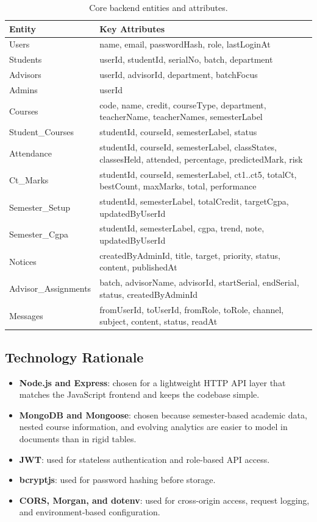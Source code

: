 \documentclass[12pt,a4paper]{article}
\begin{document}
\begin{table}[H]
\centering
\small
\begin{tabular}{L{3.1cm}L{8.7cm}}
\toprule
\textbf{Entity} & \textbf{Key Attributes} \\
\midrule
Users & name, email, passwordHash, role, lastLoginAt \\
Students & userId, studentId, serialNo, batch, department \\
Advisors & userId, advisorId, department, batchFocus \\
Admins & userId \\
Courses & code, name, credit, courseType, department, teacherName, teacherNames, semesterLabel \\
Student\_Courses & studentId, courseId, semesterLabel, status \\
Attendance & studentId, courseId, semesterLabel, classStates, classesHeld, attended, percentage, predictedMark, risk \\
Ct\_Marks & studentId, courseId, semesterLabel, ct1..ct5, totalCt, bestCount, maxMarks, total, performance \\
Semester\_Setup & studentId, semesterLabel, totalCredit, targetCgpa, updatedByUserId \\
Semester\_Cgpa & studentId, semesterLabel, cgpa, trend, note, updatedByUserId \\
Notices & createdByAdminId, title, target, priority, status, content, publishedAt \\
Advisor\_Assignments & batch, advisorName, advisorId, startSerial, endSerial, status, createdByAdminId \\
Messages & fromUserId, toUserId, fromRole, toRole, channel, subject, content, status, readAt \\
\bottomrule
\end{tabular}
\caption{Core backend entities and attributes.}
\end{table}

\subsection{Technology Rationale}
\begin{itemize}[leftmargin=*]
  \item \textbf{Node.js and Express}: chosen for a lightweight HTTP API layer that matches the JavaScript frontend and keeps the codebase simple.
  \item \textbf{MongoDB and Mongoose}: chosen because semester-based academic data, nested course information, and evolving analytics are easier to model in documents than in rigid tables.
  \item \textbf{JWT}: used for stateless authentication and role-based API access.
  \item \textbf{bcryptjs}: used for password hashing before storage.
  \item \textbf{CORS, Morgan, and dotenv}: used for cross-origin access, request logging, and environment-based configuration.
\end{itemize}
\end{document}
